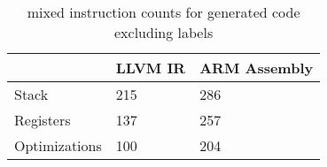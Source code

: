 \begin{table}[h!]
\centering
\begin{tabular}{p{}p{}p{}}
  \hline
 & LLVM IR & ARM Assembly \\ 
  \hline
Stack & 215 & 286 \\ 
  Registers & 137 & 257 \\ 
  Optimizations & 100 & 204 \\ 
   \hline
\end{tabular}
\caption{mixed instruction counts for generated code excluding labels}
\end{table}
